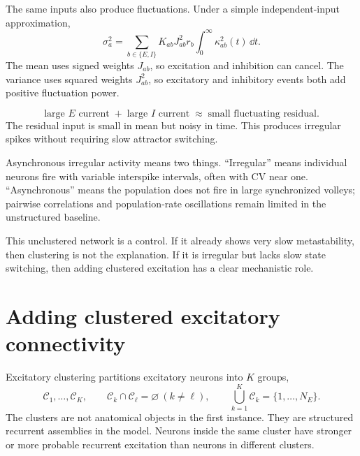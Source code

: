 The same inputs also produce fluctuations. Under a simple independent-input approximation,
%
\begin{equation}
  \sigma_a^2
  =
  \sum_{b\in\{E,I\}}
  K_{ab}J_{ab}^2r_b
  \int_0^\infty \kappa_{ab}^2(t)\,\dd t .
  \label{eq:balanced-input-variance}
\end{equation}
%
The mean uses signed weights $J_{ab}$, so excitation and inhibition can cancel. The variance uses squared weights $J_{ab}^2$, so excitatory and inhibitory events both add positive fluctuation power.

\begin{keyequation}
\begin{equation}
  \text{large } E \text{ current}
  \;+\;
  \text{large } I \text{ current}
  \;\approx\;
  \text{small fluctuating residual}.
  \label{eq:balanced-operating-point}
\end{equation}
\tcblower
The residual input is small in mean but noisy in time. This produces irregular spikes without requiring slow attractor switching.
\end{keyequation}

Asynchronous irregular activity means two things. ``Irregular'' means individual neurons fire with variable interspike intervals, often with CV near one. ``Asynchronous'' means the population does not fire in large synchronized volleys; pairwise correlations and population-rate oscillations remain limited in the unstructured baseline.

This unclustered network is a control. If it already shows very slow metastability, then clustering is not the explanation. If it is irregular but lacks slow state switching, then adding clustered excitation has a clear mechanistic role.

\section{Adding clustered excitatory connectivity}
\label{sec:adding-clustered-excitatory-connectivity}

Excitatory clustering partitions excitatory neurons into $K$ groups,
%
\begin{equation}
  \mathcal{C}_1,\ldots,\mathcal{C}_K,
  \qquad
  \mathcal{C}_k\cap \mathcal{C}_\ell=\varnothing\ (k\ne \ell),
  \qquad
  \bigcup_{k=1}^K \mathcal{C}_k=\{1,\ldots,N_E\}.
  \label{eq:excitatory-cluster-partition}
\end{equation}
%
The clusters are not anatomical objects in the first instance. They are structured recurrent assemblies in the model. Neurons inside the same cluster have stronger or more probable recurrent excitation than neurons in different clusters.


